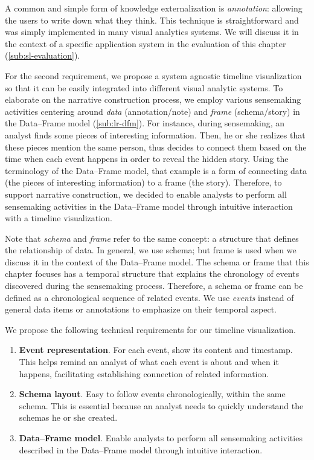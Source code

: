 A common and simple form of knowledge externalization is \emph{annotation}: allowing the users to write down what they think. This technique is straightforward and was simply implemented in many visual analytics systems. We will discuss it in the context of a specific application system in the evaluation of this chapter (\autoref{sub:sl-evaluation}).

For the second requirement, we propose a system agnostic timeline visualization so that it can be easily integrated into different visual analytic systems. To elaborate on the narrative construction process, we employ various sensemaking activities centering around \emph{data} (annotation/note) and \emph{frame} (schema/story) in the Data--Frame model (\autoref{sub:lr-dfm}). For instance, during sensemaking, an analyst finds some pieces of interesting information. Then, he or she realizes that these pieces mention the same person, thus decides to connect them based on the time when each event happens in order to reveal the hidden story. Using the terminology of the Data--Frame model, that example is a form of connecting data (the pieces of interesting information) to a frame (the story). Therefore, to support narrative construction, we decided to enable analysts to perform all sensemaking activities in the Data--Frame model through intuitive interaction with a timeline visualization. 

Note that \emph{schema} and \emph{frame} refer to the same concept: a structure that defines the relationship of data. In general, we use schema; but frame is used when we discuss it in the context of the Data--Frame model. The schema or frame that this chapter focuses has a temporal structure that explains the chronology of events discovered during the sensemaking process. Therefore, a schema or frame can be defined as a chronological sequence of related events. We use \emph{events} instead of general data items or annotations to emphasize on their temporal aspect. 

We propose the following technical requirements for our timeline visualization.

\begin{enumerate}
	\item \textbf{Event representation}. For each event, show its content and timestamp. This helps remind an analyst of what each event is about and when it happens, facilitating establishing connection of related information.
	\item \textbf{Schema layout}. Easy to follow events  chronologically, within the same schema. This is essential because an analyst needs to quickly understand the schemas he or she created.
	\item \textbf{Data--Frame model}. Enable analysts to perform all sensemaking activities described in the Data--Frame model through intuitive interaction.
\end{enumerate}